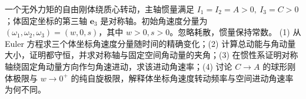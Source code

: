 一个无外力矩的自由刚体绕质心转动，主轴惯量满足 \(I_1=I_2=A>0,\ I_3=C>0\)；体固定坐标的第三轴 \(\boldsymbol e_3\) 是对称轴。初始角速度分量为 \((\omega_1,\omega_2,\omega_3)=(w,0,s)\)，其中 \(w>0,s>0\)。忽略耗散，惯量保持常数。
(1) 从 Euler 方程求三个体坐标角速度分量随时间的精确变化；(2) 计算总动能与角动量大小，证明都守恒，并求对称轴与固定空间角动量的夹角；(3) 在惯性系证明对称轴绕固定角动量方向作匀角速进动，求该进动角速率；(4) 讨论 \(C\to A\) 的球形刚体极限与 \(w\to0^+\) 的纯自旋极限，解释体坐标角速度转动频率与空间进动角速率为何不同。

